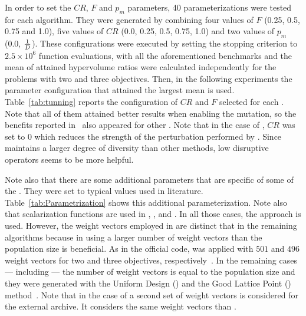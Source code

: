 In order to set the $CR$, $F$ and $p_m$ parameters, 40 parameterizations were tested for each algorithm.
%
They were generated by combining four values of $F$ (0.25, 0.5, 0.75 and 1.0), five values of $CR$ (0.0, 0.25, 0.5, 0.75, 1.0) 
and two values of $p_m$ (0.0, $1\over{D}$).
%
These configurations were executed by setting the stopping criterion to $2.5 \times 10^{6}$ function evaluations, 
with all the aforementioned benchmarks and the mean of attained hypervolume ratios were calculated independently
for the problems with two and three objectives.
%
Then, in the following experiments the parameter configuration that attained the largest mean is used.
%
Table~\ref{tab:tunning} reports the configuration of $CR$ and $F$ selected for each \MOEA{}.
%
Note that all of them attained better results when enabling the mutation, so the benefits reported in~\cite{zhang2009performance}
also appeared for other \MOEAS{}.
%
Note that in the case of \AVSDMOEAD{}, $CR$ was set to 0 which reduces the strength of the perturbation performed
by \DE{}.
%
Since \AVSDMOEAD{} maintains a larger degree of diversity than other methods, low disruptive
operators seems to be more helpful.



Note also that there are some additional parameters that are specific of some of the \MOEAS{}.
%
They were set to typical values used in literature. 
%
Table~\ref{tab:Parametrization} shows this additional parameterization.
%
Note also that scalarization functions are used in \MOEADDE{}, \RMOEA{}, \NSGAIII{} and \AVSDMOEAD{}.
%
In all those cases, the \ASF{} approach is used.
%
However, the weight vectors employed in \RMOEA{} are distinct that in the remaining algorithms because in \RMOEA{} using
a larger number of weight vectors than the population size is beneficial.
%
As in the official code, \RMOEA{} was applied with $501$ and $496$ weight vectors for two and three objectives, 
respectively~\cite{trautmann2013r2}.
%
In the remaining cases --- including \AVSDMOEAD{} --- the number of weight vectors is equal to the population size and they were generated
with the Uniform Design (\UD{}) and the Good Lattice Point (\GLP{}) method~\cite{tan2013moea1, tan2013moea2}.
%
Note that in the case of \AVSDMOEAD{} a second set of weight vectors is considered for the external archive.
%
It considers the same weight vectors than \RMOEA{}.

